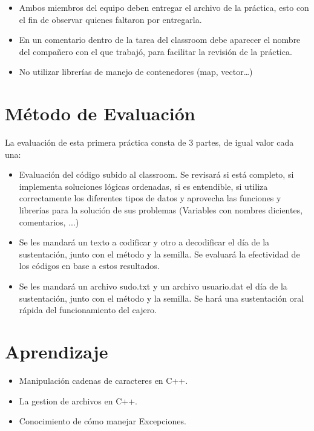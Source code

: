 \documentclass{article}
\begin{document}
\begin{itemize}
\item Ambos miembros del equipo deben entregar el archivo de la práctica, esto  con el fin de observar quienes faltaron por entregarla. \\
\end{itemize}

\begin{itemize}
\item En un comentario dentro de la tarea del classroom debe aparecer el nombre  del compañero con el que trabajó, para facilitar la revisión de la práctica.\\
\end{itemize}

\begin{itemize}
\item No utilizar librerías de manejo de contenedores (map, vector…) \\
\end{itemize}



\section{Método de Evaluación} \label{contenido}
La evaluación de esta primera práctica consta de 3 partes, de igual valor cada una: 
\begin{itemize}
\item Evaluación del código subido al classroom. Se revisará si está completo, si  implementa soluciones lógicas ordenadas, si es entendible, si utiliza  correctamente los diferentes tipos de datos y aprovecha las funciones y  librerías para la solución de sus problemas (Variables con nombres dicientes, 
		  comentarios, ...) 
\end{itemize}

\begin{itemize}
\item Se les mandará un texto a codificar y otro a decodificar el día de la sustentación, junto con el método y la semilla. Se evaluará la efectividad de los códigos en base a estos resultados. 
\end{itemize}

\begin{itemize}
\item Se les mandará un archivo sudo.txt y un archivo usuario.dat el día de la sustentación, junto con el método y la semilla. Se hará una sustentación oral  rápida del funcionamiento del cajero.
\end{itemize}






\section{Aprendizaje}\label{contenido}
\begin{itemize}
\item  Manipulación cadenas de caracteres en C++.
\end{itemize}
\begin{itemize}
\item La gestion de archivos en C++.
\end{itemize}
\begin{itemize}
\item Conocimiento de  cómo manejar Excepciones.
\end{itemize}
\end{document}
